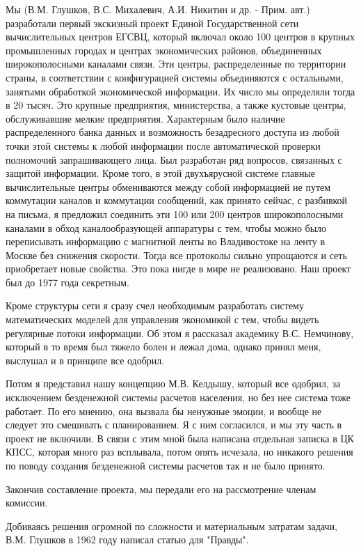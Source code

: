 \documentclass{article}
\begin{document}
Мы (В.М. Глушков, В.С. Михалевич, А.И. Никитин и др. - Прим. авт.) разработали
первый экскизный проект Единой Государственной сети вычислительных центров
ЕГСВЦ, который включал около 100 центров в крупных промышленных городах и
центрах экономических районов, объединенных широкополосными каналами связи. Эти
центры, распределенные по территории страны, в соответствии с конфигурацией
системы объединяются с остальными, занятыми обработкой экономической информации.
Их число мы определяли тогда в 20 тысяч. Это крупные предприятия, министерства,
а также кустовые центры, обслуживавшие мелкие предприятия. Характерным было
наличие распределенного банка данных и возможность безадресного доступа из любой
точки этой системы к любой информации после автоматической проверки полномочий
запрашивающего лица. Был разработан ряд вопросов, связанных с защитой
информации. Кроме того, в этой двухъярусной системе главные вычислительные
центры обмениваются между собой информацией не путем коммутации каналов и
коммутации сообщений, как принято сейчас, с разбивкой на письма, я предложил
соединить эти 100 или 200 центров широкополосными каналами в обход
каналообразующей аппаратуры с тем, чтобы можно было переписывать информацию с
магнитной ленты во Владивостоке на ленту в Москве без снижения скорости. Тогда
все протоколы сильно упрощаются и сеть приобретает новые свойства. Это пока
нигде в мире не реализовано. Наш проект был до 1977 года секретным.

Кроме структуры сети я сразу счел необходимым разработать систему математических
моделей для управления экономикой с тем, чтобы видеть регулярные потоки
информации. Об этом я рассказал академику В.С. Немчинову, который в то время был
тяжело болен и лежал дома, однако принял меня, выслушал и в принципе все
одобрил.

Потом я представил нашу концепцию М.В. Келдышу, который все одобрил, за
исключением безденежной системы расчетов населения, но без нее система тоже
работает. По его мнению, она вызвала бы ненужные эмоции, и вообще не следует это
смешивать с планированием. Я с ним согласился, и мы эту часть в проект не
включили. В связи с этим мной была написана отдельная записка в ЦК КПСС, которая
много раз всплывала, потом опять исчезала, но никакого решения по поводу
создания безденежной системы расчетов так и не было принято.

Закончив составление проекта, мы передали его на рассмотрение членам комиссии.

Добиваясь решения огромной по сложности и материальным затратам задачи, В.М.
Глушков в 1962 году написал статью для "Правды".
\end{document}
